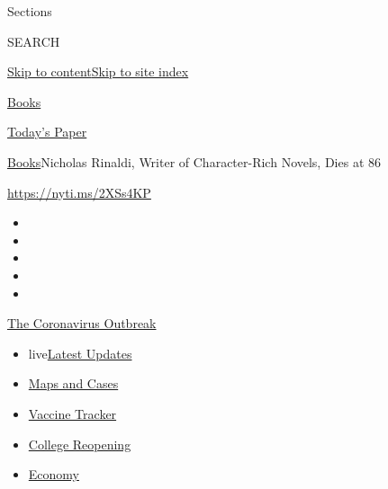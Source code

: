 Sections

SEARCH

\protect\hyperlink{site-content}{Skip to
content}\protect\hyperlink{site-index}{Skip to site index}

\href{https://www.nytimes3xbfgragh.onion/section/books}{Books}

\href{https://myaccount.nytimes3xbfgragh.onion/auth/login?response_type=cookie\&client_id=vi}{}

\href{https://www.nytimes3xbfgragh.onion/section/todayspaper}{Today's
Paper}

\href{/section/books}{Books}\textbar{}Nicholas Rinaldi, Writer of
Character-Rich Novels, Dies at 86

\url{https://nyti.ms/2XSs4KP}

\begin{itemize}
\item
\item
\item
\item
\item
\end{itemize}

\href{https://www.nytimes3xbfgragh.onion/news-event/coronavirus?action=click\&pgtype=Article\&state=default\&region=TOP_BANNER\&context=storylines_menu}{The
Coronavirus Outbreak}

\begin{itemize}
\tightlist
\item
  live\href{https://www.nytimes3xbfgragh.onion/2020/08/04/world/coronavirus-covid-19.html?action=click\&pgtype=Article\&state=default\&region=TOP_BANNER\&context=storylines_menu}{Latest
  Updates}
\item
  \href{https://www.nytimes3xbfgragh.onion/interactive/2020/us/coronavirus-us-cases.html?action=click\&pgtype=Article\&state=default\&region=TOP_BANNER\&context=storylines_menu}{Maps
  and Cases}
\item
  \href{https://www.nytimes3xbfgragh.onion/interactive/2020/science/coronavirus-vaccine-tracker.html?action=click\&pgtype=Article\&state=default\&region=TOP_BANNER\&context=storylines_menu}{Vaccine
  Tracker}
\item
  \href{https://www.nytimes3xbfgragh.onion/2020/08/02/us/covid-college-reopening.html?action=click\&pgtype=Article\&state=default\&region=TOP_BANNER\&context=storylines_menu}{College
  Reopening}
\item
  \href{https://www.nytimes3xbfgragh.onion/live/2020/08/03/business/stock-market-today-coronavirus?action=click\&pgtype=Article\&state=default\&region=TOP_BANNER\&context=storylines_menu}{Economy}
\end{itemize}

